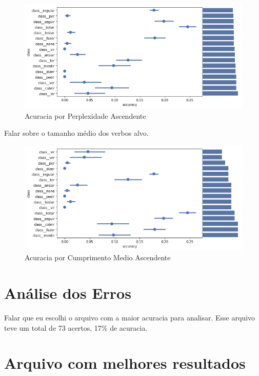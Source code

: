 \begin{figure}[H]
  \centering
  \includegraphics[width=1.0\linewidth]{img/accuracyperplexity.png}
  \caption{Acuracia por Perplexidade Ascendente}
  \label{fig:kfoldprop}
\end{figure}

Falar sobre o tamanho médio dos verbos alvo.

\begin{figure}[H]
  \centering
  \includegraphics[width=1.0\linewidth]{img/downloadaccuracy_kfold_3.png}
  \caption{Acuracia por Cumprimento Medio Ascendente}
  \label{fig:kfoldprop}
\end{figure}


\section{Análise dos Erros}

Falar que eu escolhi o arquivo com a maior acuracia para analisar. Esse arquivo teve um total de 73 acertos, 17\% de acuracia.


\section{Arquivo com melhores resultados}

